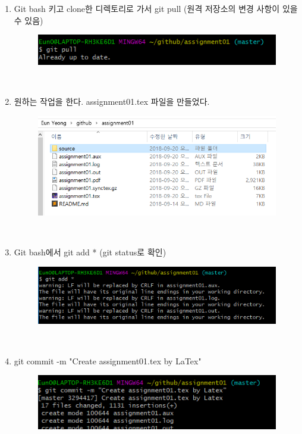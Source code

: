 \documentclass[a4paper]{article}
\begin{document}
	\begin{enumerate}
		\item Git bash 키고 clone한 디렉토리로 가서 git pull (원격 저장소의 변경 사항이 있을 수 있음)
		\begin{figure}[htbp]
			\begin{center}
				\includegraphics[scale=1]{source/1}
			\end{center}
		\end{figure}\\
	
		\item 원하는 작업을 한다. assignment01.tex 파일을 만들었다.
		\begin{figure}[htbp]
			\begin{center}
				\includegraphics[scale=1]{source/2}
			\end{center}
		\end{figure}\\
	
		\item Git bash에서 git add * (git status로 확인)
		\begin{figure}[htbp]
			\begin{center}
				\includegraphics[scale=1]{source/3}
			\end{center}
		\end{figure}\\
	
		\item git commit -m "Create assignment01.tex by LaTex"
		\begin{figure}[h!tbp]
			\begin{center}
				\includegraphics[scale=1]{source/4}
			\end{center}
		\end{figure}
	

\end{enumerate}
\end{document}
